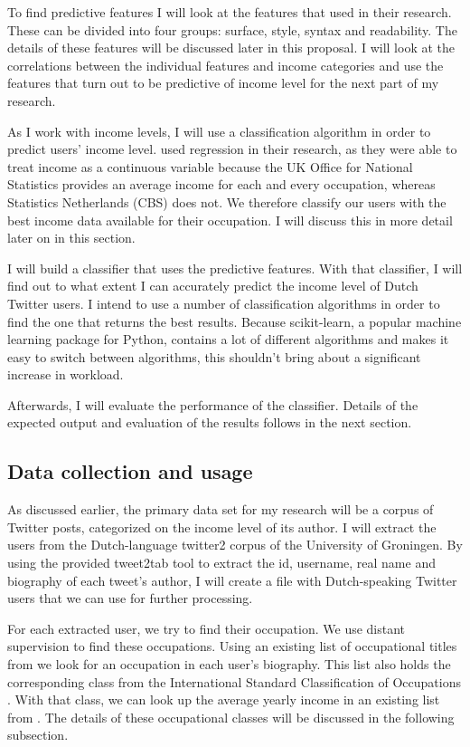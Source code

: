 \documentclass[11pt, a4paper]{article}
\begin{document}
To find predictive features I will look at the features that \citet{flekova} used in their research. These can be divided into four groups: surface, style, syntax and readability.  The details of these features will be discussed later in this proposal. I will look at the correlations between the individual features and income categories and use the features that turn out to be predictive of income level for the next part of my research.

As I work with income levels, I will use a classification algorithm in order to predict users' income level. \citet{flekova} used regression in their research, as they were able to treat income as a continuous variable because the UK Office for National Statistics provides an average income for each and every occupation, whereas Statistics Netherlands (CBS) does not.  We therefore classify our users with the best income data available for their occupation. I will discuss this in more detail later on in this section.

I will build a classifier that uses the predictive features. With that classifier, I will find out to what extent I can accurately predict the income level of Dutch Twitter users. I intend to use a number of classification algorithms in order to find the one that returns the best results. Because scikit-learn, a popular machine learning package for Python, contains a lot of different algorithms and makes it easy to switch between algorithms, this shouldn't bring about a significant increase in workload.

Afterwards, I will evaluate the performance of the classifier. Details of the expected output and evaluation of the results follows in the next section.

\subsection{Data collection and usage}
As discussed earlier, the primary data set for my research will be a corpus of Twitter posts, categorized on the income level of its author. I will extract the users from the Dutch-language twitter2 corpus of the University of Groningen. By using the provided tweet2tab tool to extract the id, username, real name and biography of each tweet's author, I will create a file with Dutch-speaking Twitter users that we can use for further processing. 

For each extracted user, we try to find their occupation. We use distant supervision to find these occupations. Using an existing list of occupational titles from \cite{codelijsten} we look for an occupation in each user's biography. This list also holds the corresponding class from the International Standard Classification of Occupations \citep{isco}.  With that class, we can look up the average yearly income in an existing list from \cite{uurlonen}. The details of these occupational classes will be discussed in the following subsection.
\end{document}
